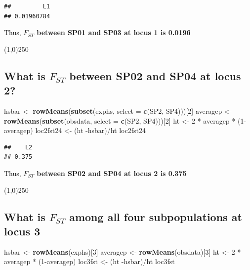 \documentclass[]{article}
\newenvironment{Shaded}{\begin{snugshade}}{\end{snugshade}}
\newcommand{\KeywordTok}[1]{\textcolor[rgb]{0.13,0.29,0.53}{\textbf{{#1}}}}
\newcommand{\DataTypeTok}[1]{\textcolor[rgb]{0.13,0.29,0.53}{{#1}}}
\newcommand{\DecValTok}[1]{\textcolor[rgb]{0.00,0.00,0.81}{{#1}}}
\newcommand{\StringTok}[1]{\textcolor[rgb]{0.31,0.60,0.02}{{#1}}}
\newcommand{\NormalTok}[1]{{#1}}
\begin{document}
\begin{verbatim}
##         L1 
## 0.01960784
\end{verbatim}

Thus, \textbf{$F_{ST}$ between SP01 and SP03 at locus 1 is 0.0196}

\begin{center}
\line(1,0){250}
\end{center}

\subsection{What is $F_{ST}$ between SP02 and SP04 at locus
2?}\label{what-is-fux5fst-between-sp02-and-sp04-at-locus-2}

\begin{Shaded}
\begin{Highlighting}[]
\NormalTok{hsbar <-}\StringTok{ }\KeywordTok{rowMeans}\NormalTok{(}\KeywordTok{subset}\NormalTok{(exphs, }\DataTypeTok{select =} \KeywordTok{c}\NormalTok{(SP2, SP4)))[}\DecValTok{2}\NormalTok{]}
\NormalTok{averagep <-}\StringTok{ }\KeywordTok{rowMeans}\NormalTok{(}\KeywordTok{subset}\NormalTok{(obsdata, }\DataTypeTok{select =} \KeywordTok{c}\NormalTok{(SP2, SP4)))[}\DecValTok{2}\NormalTok{]}
\NormalTok{ht <-}\StringTok{ }\DecValTok{2} \NormalTok{*}\StringTok{ }\NormalTok{averagep *}\StringTok{ }\NormalTok{(}\DecValTok{1}\NormalTok{-averagep)}
\NormalTok{loc2fst24 <-}\StringTok{ }\NormalTok{(ht -hsbar)/ht}
\NormalTok{loc2fst24}
\end{Highlighting}
\end{Shaded}

\begin{verbatim}
##    L2 
## 0.375
\end{verbatim}

Thus, \textbf{$F_{ST}$ between SP02 and SP04 at locus 2 is 0.375}

\begin{center}
\line(1,0){250}
\end{center}

\subsection{What is $F_{ST}$ among all four subpopulations at locus
3}\label{what-is-fux5fst-among-all-four-subpopulations-at-locus-3}

\begin{Shaded}
\begin{Highlighting}[]
\NormalTok{hsbar <-}\StringTok{ }\KeywordTok{rowMeans}\NormalTok{(exphs)[}\DecValTok{3}\NormalTok{]}
\NormalTok{averagep <-}\StringTok{ }\KeywordTok{rowMeans}\NormalTok{(obsdata)[}\DecValTok{3}\NormalTok{]}
\NormalTok{ht <-}\StringTok{ }\DecValTok{2} \NormalTok{*}\StringTok{ }\NormalTok{averagep *}\StringTok{ }\NormalTok{(}\DecValTok{1}\NormalTok{-averagep)}
\NormalTok{loc3fst <-}\StringTok{ }\NormalTok{(ht -hsbar)/ht}
\NormalTok{loc3fst}
\end{Highlighting}
\end{Shaded}
\end{document}
